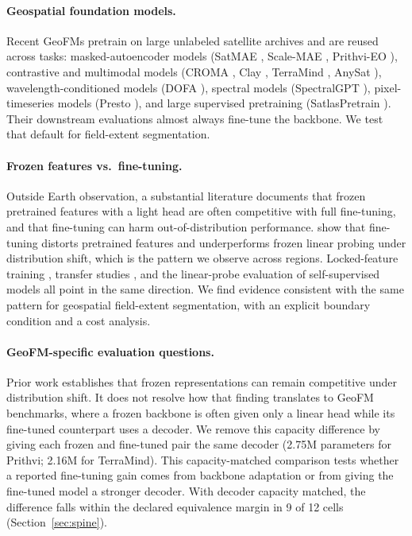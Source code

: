 \documentclass{article}
\begin{document}
\paragraph{Geospatial foundation models.} Recent GeoFMs pretrain on large unlabeled
satellite archives and are reused across tasks: masked-autoencoder models (SatMAE
\citep{satmae}, Scale-MAE \citep{scalemae}, Prithvi-EO \citep{prithvi}), contrastive
and multimodal models (CROMA \citep{croma}, Clay \citep{clay}, TerraMind
\citep{terramind}, AnySat \citep{anysat}), wavelength-conditioned models (DOFA
\citep{dofa}), spectral models (SpectralGPT \citep{spectralgpt}), pixel-timeseries
models (Presto \citep{presto}), and large supervised pretraining (SatlasPretrain
\citep{satlas}). Their downstream evaluations almost always fine-tune the backbone.
We test that default for field-extent segmentation.

\paragraph{Frozen features vs.\ fine-tuning.} Outside Earth observation, a
substantial literature documents that frozen pretrained features with a light head
are often competitive with full fine-tuning, and that fine-tuning can harm
out-of-distribution performance. \citet{kumar2022finetuning} show that fine-tuning
distorts pretrained features and underperforms frozen linear probing under
distribution shift, which is the pattern we observe across regions. Locked-feature
training \citep{zhai2022lit}, transfer studies
\citep{kornblith2019transfer,kolesnikov2020bit}, and the linear-probe evaluation of
self-supervised models \citep{he2022mae} all point in the same direction. We
find evidence consistent with the same pattern for geospatial field-extent
segmentation, with an explicit boundary condition and a cost analysis.

\paragraph{GeoFM-specific evaluation questions.}
Prior work establishes that frozen representations can remain competitive under
distribution shift. It does not resolve how that finding translates to GeoFM benchmarks,
where a frozen backbone is often given only a linear head while its fine-tuned counterpart
uses a decoder. We remove this capacity difference by giving each frozen and fine-tuned
pair the same decoder (2.75M parameters for Prithvi; 2.16M for TerraMind). This
capacity-matched comparison tests whether a reported fine-tuning gain comes from
backbone adaptation or from giving the fine-tuned model a stronger decoder. With
decoder capacity matched, the difference falls within the
declared equivalence margin in 9 of 12 cells (Section~\ref{sec:spine}).
\end{document}
